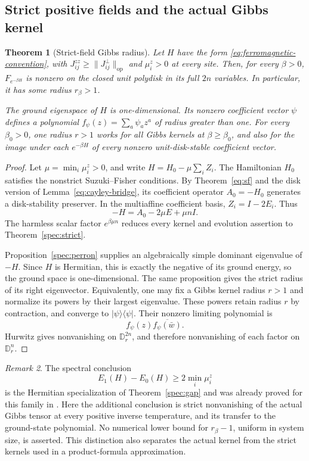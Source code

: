 \documentclass[reqno]{amsart}
\newtheorem{theorem}{Theorem}[section]
\theoremstyle{definition}
\theoremstyle{remark}
\newtheorem{remark}[theorem]{Remark}
\newcommand{\D}{\mathbb D}
\begin{document}
\subsection{Strict positive fields and the actual Gibbs kernel}

\begin{theorem}[Strict-field Gibbs radius]\label{eq:strict-field}
Let \(H\) have the form \eqref{eq:ferromagnetic-convention}, with
\(J_{ij}^{zz}\ge\|J_{ij}^{\perp}\|_{\mathrm{op}}\) and
\(\mu_i^z>0\) at every site.  Then, for every \(\beta>0\),
\(F_{e^{-\beta H}}\) is nonzero on the closed unit polydisk in
its full \(2n\) variables.  In particular, it has some radius
\(r_\beta>1\).

The ground eigenspace of \(H\) is one-dimensional.  Its nonzero
coefficient vector \(\psi\) defines a polynomial
\(f_\psi(z)=\sum_a\psi_a z^a\) of radius greater than one.
For every \(\beta_0>0\), one radius \(r>1\) works for all
Gibbs kernels at \(\beta\ge\beta_0\), and also for the image
under each \(e^{-\beta H}\) of every nonzero unit-disk-stable
coefficient vector.
\end{theorem}
\begin{proof}
Let \(\mu=\min_i\mu_i^z>0\), and write
\(H=H_0-\mu\sum_iZ_i\).  The Hamiltonian \(H_0\) satisfies
the nonstrict Suzuki--Fisher conditions.  By Theorem~\ref{eq:sf}
and the disk version of Lemma~\ref{eq:cayley-bridge}, its
coefficient operator \(A_0=-H_0\) generates a disk-stability
preserver.  In the multiaffine coefficient basis,
\(Z_i=I-2E_i\).  Thus
\[
 -H=A_0-2\mu E+\mu nI.
\]
The harmless scalar factor \(e^{\beta\mu n}\) reduces every
kernel and evolution assertion to Theorem~\ref{spec:strict}.

Proposition~\ref{spec:perron} supplies an algebraically simple
dominant eigenvalue of \(-H\).  Since \(H\) is Hermitian,
this is exactly the negative of its ground energy, so the ground
space is one-dimensional.  The same proposition gives the strict
radius of its right eigenvector.  Equivalently, one may fix a
Gibbs kernel radius \(r>1\) and normalize its powers by their
largest eigenvalue.  These powers retain radius \(r\) by
contraction, and converge to \(|\psi\rangle\langle\psi|\).
Their nonzero limiting polynomial is
\[
 f_\psi(z)\overline{f_\psi(\bar w)}.
\]
Hurwitz gives nonvanishing on \(\D_r^{2n}\), and therefore
nonvanishing of each factor on \(\D_r^n\).
\end{proof}

\begin{remark}\label{eq:gap-attribution}
The spectral conclusion
\[
 E_1(H)-E_0(H)\ge2\min_i\mu_i^z
\]
is the Hermitian specialization of Theorem~\ref{spec:gap} and
was already proved for this family in
\cite[Theorem~1]{BGLW26}.  Here the additional conclusion is
strict nonvanishing of the actual Gibbs tensor at every positive
inverse temperature, and its transfer to the ground-state polynomial.
No numerical lower bound for \(r_\beta-1\), uniform in system
size, is asserted.  This distinction also separates the actual
kernel from the strict kernels used in a product-formula approximation.
\end{remark}
\end{document}
